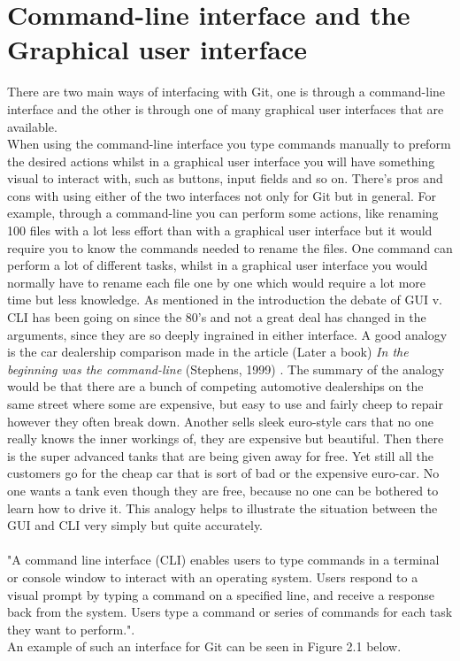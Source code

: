 \documentclass[a4paper,oneside]{bth} %
\begin{document}
			\section{Command-line interface and the Graphical user interface}
			There are two main ways of interfacing with Git, one is through a command-line interface and the other is through one of many graphical user interfaces that are available. \cite{GitGUIs}\\
			
			When using the command-line interface you type commands manually to preform the desired actions whilst in a graphical user interface you will have something visual to interact with, such as buttons, input fields and so on.
			There's pros and cons with using either of the two interfaces not only for Git but in general.
			For example, through a command-line you can perform some actions, like renaming 100 files with a lot less effort than with a graphical user interface but it would require you to know the commands needed to rename the files. One command can perform a lot of different tasks, whilst in a graphical user interface you would normally have to rename each file one by one which would require a lot more time but less knowledge. As mentioned in the introduction the debate of GUI v. CLI has been going on since the 80's and not a great deal has changed in the arguments, since they are so deeply ingrained in either interface. 
			A good analogy is the car dealership comparison made in the article (Later a book) \textit{In the beginning was the command-line} (Stephens, 1999) \cite{InTheBeginning}. The summary of the analogy would be that there are a bunch of competing automotive dealerships on the same street where some are expensive, but easy to use and fairly cheep to repair however they often break down. Another sells sleek euro-style cars that no one really knows the inner workings of, they are expensive but beautiful. Then there is the super advanced tanks that are being given away for free. Yet still all the customers go for the cheap car that is sort of bad or the expensive euro-car. No one wants a tank even though they are free, because no one can be bothered to learn how to drive it. 
			This analogy helps to illustrate the situation between the GUI and CLI very simply but quite accurately.
			\\\\
			"A command line interface (CLI) enables users to type commands in a terminal or console window to interact with an operating system. Users respond to a visual prompt by typing a command on a specified line, and receive a response back from the system. Users type a command or series of commands for each task they want to perform."\cite{OracleCLIAndGUI}.\\
			An example of such an interface for Git can be seen in Figure 2.1 below.
			
\end{document}

